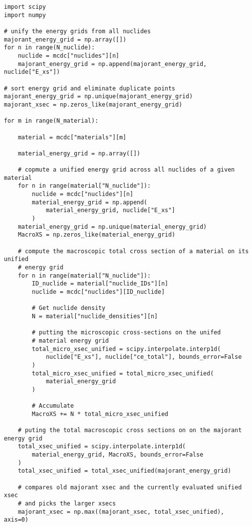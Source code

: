 \begin{verbatim}
import scipy
import numpy

# unify the energy grids from all nuclides
majorant_energy_grid = np.array([])
for n in range(N_nuclide):
    nuclide = mcdc["nuclides"][n]
    majorant_energy_grid = np.append(majorant_energy_grid, nuclide["E_xs"])

# sort energy grid and eliminate duplicate points
majorant_energy_grid = np.unique(majorant_energy_grid)
majorant_xsec = np.zeros_like(majorant_energy_grid)

for m in range(N_material):

    material = mcdc["materials"][m]

    material_energy_grid = np.array([])

    # copmute a unified energy grid across all nuclides of a given material
    for n in range(material["N_nuclide"]):
        nuclide = mcdc["nuclides"][n]
        material_energy_grid = np.append(
            material_energy_grid, nuclide["E_xs"]
        )
    material_energy_grid = np.unique(material_energy_grid)
    MacroXS = np.zeros_like(material_energy_grid)

    # compute the macroscopic total cross section of a material on its unified
    # energy grid
    for n in range(material["N_nuclide"]):
        ID_nuclide = material["nuclide_IDs"][n]
        nuclide = mcdc["nuclides"][ID_nuclide]

        # Get nuclide density
        N = material["nuclide_densities"][n]

        # putting the microscopic cross-sections on the unifed
        # material energy grid
        total_micro_xsec_unified = scipy.interpolate.interp1d(
            nuclide["E_xs"], nuclide["ce_total"], bounds_error=False
        )
        total_micro_xsec_unified = total_micro_xsec_unified(
            material_energy_grid
        )

        # Accumulate
        MacroXS += N * total_micro_xsec_unified

    # puting the total macroscopic cross sections on on the majorant energy grid
    total_xsec_unified = scipy.interpolate.interp1d(
        material_energy_grid, MacroXS, bounds_error=False
    )
    total_xsec_unified = total_xsec_unified(majorant_energy_grid)

    # compares old majorant xsec and the currently evaluated unified xsec 
    # and picks the larger xsecs
    majorant_xsec = np.max((majorant_xsec, total_xsec_unified), axis=0)

\end{verbatim}